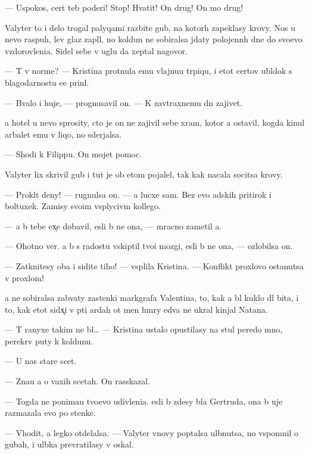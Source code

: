 \documentclass[10pt]{book}
\begin{document}
— Uspoko{\y}s{\ia}, cert teb{\ia} poderi! Stop! Hvatit! On drug! On mo{\y} drug!



Valyter to i delo trogal palyqami razbit{\yi}{\y}e gub{\yi}, na kotor{\yi}h zapeklasy krovy. Nos u nevo raspuh, lev{\yi}{\y} glaz zapl{\yi}l, no koldun ne sobiralsa jdaty polojenn{\yi}h dne{\y} do svo{\y}evo v{\yi}zdorovleni{\y}a. Sidel sebe v uglu da xeptal nagovor{\yi}.

— T{\yi} v norme? — Kristina prot{\ia}nula {\y}emu vlajnu{\y}u tr{\ia}piqu, i etot certov ubl{\iu}dok s blagodarnost{\y}u {\y}e{\y}e prin{\ia}l.

— B{\yi}valo i huje, — prognusavil on. — K zavtraxnemu dn{\iu} zajivet.

{\Y}a hotel u nevo sprosity, cto je on ne zajivil sebe xram, kotor{\yi}{\y} {\y}a ostavil, kogda kinul arbalet {\y}emu v liqo, no sderjalsa.

— Shodi k Filippu. On mojet pomoc.

Valyter lix skrivil gub{\yi} i tut je ob etom pojalel, tak kak nacala socitsa krovy.

— Prokl{\ia}t{\yi}{\y} deny! — rugnulsa on. — {\Y}a lucxe sam. Bez {\y}evo adskih pritirok i boltuxek. Za{\y}misy svo{\y}im vsp{\yi}lyciv{\yi}m kollego{\y}.

— {\Y}a b{\yi} tebe {\y}ex̨e dobavil, {\y}esli b{\yi} ne ona, — mracno zametil {\y}a.

— Ohotno ver{\iu}. {\Y}a b{\yi} s radost{\y}u vskip{\ia}til tvo{\y}i mozgi, {\y}esli b{\yi} ne ona, — ozlobilsa on.

— Zatknitesy oba i sidite tiho! — vsp{\yi}lila Kristina. — Konflikt{\yi} proxlovo ostanutsa v proxlom!

{\Y}a ne sobiralsa zab{\yi}vaty zastenki markgrafa Valentina, to, kak {\y}a b{\yi}l kuklo{\y} dl{\ia} bit{\y}a, i to, kak etot sid{\ia}x̨i{\y} v p{\ia}ti {\y}ardah ot men{\ia} hm{\yi}ry {\y}edva ne ukral kinjal Natana.

— T{\yi} ranyxe takim ne b{\yi}l… — Kristina ustalo opustilasy na stul peredo mno{\y}, perekr{\yi}v puty k koldunu.

— U nas star{\yi}{\y}e scet{\yi}.

— Zna{\y}u {\y}a o vaxih scetah. On rasskazal.

— Togda ne ponima{\y}u tvo{\y}evo udivleni{\y}a. {\Y}esli b{\yi} zdesy b{\yi}la Gertruda, ona b{\yi} uje razmazala {\y}evo po stenke.

— V{\yi}hodit, {\y}a legko otdelalsa. — Valyter vnovy pop{\yi}talsa ul{\yi}bnutsa, no vspomnil o gubah, i ul{\yi}bka prevratilasy v oskal.
\end{document}
